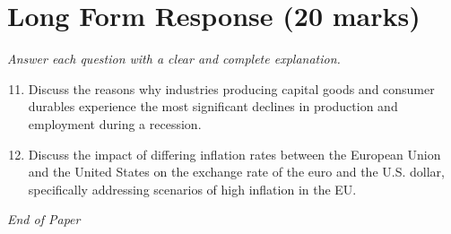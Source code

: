 \documentclass[12pt]{article}
\begin{document}
\section*{Long Form Response (20 marks)}
\textit{Answer each question with a clear and complete explanation.}
\begin{enumerate}[label=\arabic*.]
\setcounter{enumi}{10}
\item Discuss the reasons why industries producing capital goods and consumer durables experience the most significant declines in production and employment during a recession.
\item Discuss the impact of differing inflation rates between the European Union and the United States on the exchange rate of the euro and the U.S. dollar, specifically addressing scenarios of high inflation in the EU.
\end{enumerate}

\vfill
\noindent\textit{End of Paper}
\end{document}

